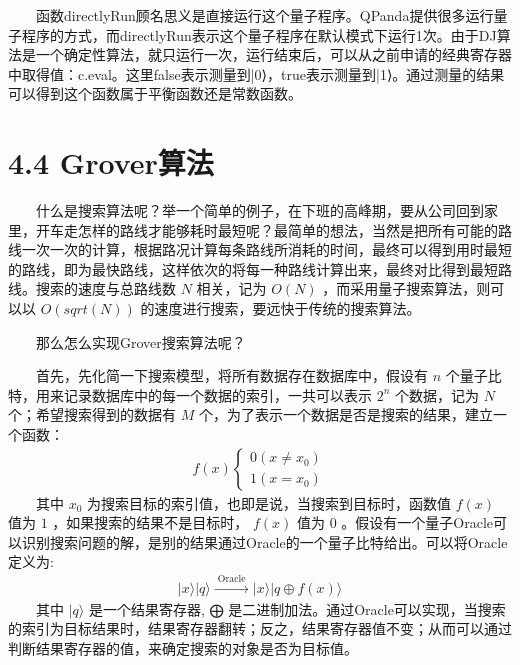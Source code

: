 \documentclass[a4paper,11pt,english]{sphinxmanual}
\begin{document}
\sphinxAtStartPar
  函数directlyRun顾名思义是直接运行这个量子程序。QPanda提供很多运行量子程序的方式，而directlyRun表示这个量子程序在默认模式下运行1次。由于DJ算法是一个确定性算法，就只运行一次，运行结束后，可以从之前申请的经典寄存器中取得值：c.eval。这里false表示测量到|0⟩，true表示测量到|1⟩。通过测量的结果可以得到这个函数属于平衡函数还是常数函数。

\sphinxstepscope


\section{4.4 Grover算法}
\label{\detokenize{rst/4.4Grover_u7b97_u6cd5:grover}}\label{\detokenize{rst/4.4Grover_u7b97_u6cd5::doc}}
\sphinxAtStartPar
  什么是搜索算法呢？举一个简单的例子，在下班的高峰期，要从公司回到家里，开车走怎样的路线才能够耗时最短呢？最简单的想法，当然是把所有可能的路线一次一次的计算，根据路况计算每条路线所消耗的时间，最终可以得到用时最短的路线，即为最快路线，这样依次的将每一种路线计算出来，最终对比得到最短路线。搜索的速度与总路线数 \(N\) 相关，记为  \(O(N)\) ，而采用量子搜索算法，则可以以  \(O(sqrt(N))\) 的速度进行搜索，要远快于传统的搜索算法。

\sphinxAtStartPar
  那么怎么实现Grover搜索算法呢？

\sphinxAtStartPar
  首先，先化简一下搜索模型，将所有数据存在数据库中，假设有 \(n\) 个量子比特，用来记录数据库中的每一个数据的索引，一共可以表示 \(2^n\) 个数据，记为 \(N\) 个；希望搜索得到的数据有 \(M\) 个，为了表示一个数据是否是搜索的结果，建立一个函数：
\begin{equation*}
\begin{split}f(x)\left\{\begin{array}{l} 0\left(x \neq x_{0}\right) \\ 1\left(x=x_{0}\right) \end{array}\right.\end{split}
\end{equation*}
\sphinxAtStartPar
  其中 \(x_0\) 为搜索目标的索引值，也即是说，当搜索到目标时，函数值 \(f(x)\) 值为 \(1\) ，如果搜索的结果不是目标时， \(f(x)\) 值为 \(0\) 。假设有一个量子Oracle可以识别搜索问题的解，是别的结果通过Oracle的一个量子比特给出。可以将Oracle定义为:
\begin{equation*}
\begin{split}|x\rangle|q\rangle \stackrel{\text { Oracle }}{\longrightarrow}|x\rangle|q\oplus f(x)\rangle\end{split}
\end{equation*}
\sphinxAtStartPar
  其中 \(|q \rangle\) 是一个结果寄存器, ⨁ 是二进制加法。通过Oracle可以实现，当搜索的索引为目标结果时，结果寄存器翻转；反之，结果寄存器值不变；从而可以通过判断结果寄存器的值，来确定搜索的对象是否为目标值。
\end{document}
